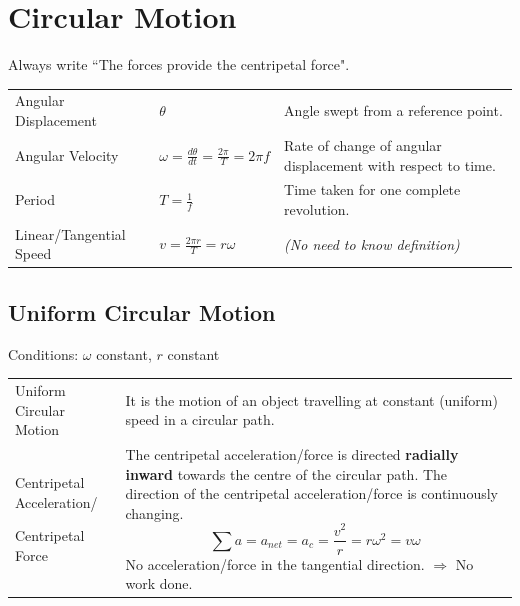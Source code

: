 \documentclass[a4paper,11pt]{article}
\begin{document}
	\section{Circular Motion}
		Always write ``The \underline{\hspace{1.5cm}} forces provide the centripetal force".
		\begin{center}
			\renewcommand{\arraystretch}{1.5}
			\begin{tabular}{@{} l l p{7cm} @{}}
				\toprule
				Angular Displacement & $\theta$ & Angle swept from a reference point. \\
				Angular Velocity & $\omega=\frac{d\theta}{dt}=\frac{2\pi}{T}=2\pi f$ & Rate of change of angular displacement with respect to time. \\
				Period & $T=\frac{1}{f}$ & Time taken for one complete revolution. \\
				Linear/Tangential Speed & $v=\frac{2\pi r}{T}=r\omega$ & \textit{(No need to know definition)}\\
				\bottomrule
			\end{tabular}
		\end{center}
		\subsection{Uniform Circular Motion}
			Conditions: $\omega$ constant, $r$ constant
			\begin{center}
				\renewcommand{\arraystretch}{1.2}
				\begin{tabular}{@{} p{4cm} p{10.6cm} @{}}
					\toprule
					Uniform Circular Motion & It is the motion of an object travelling at constant (uniform) speed in a circular path. \\
					Centripetal Acceleration/ \par Centripetal Force& The centripetal acceleration/force is directed \textbf{radially inward} towards the centre of the circular path. The direction of the centripetal acceleration/force is continuously changing. $$\sum a = a_{net} = a_c=\frac{v^2}{r}=r\omega^2=v\omega$$ No acceleration/force in the tangential direction. $\Rightarrow$ No work done. 
					\\
					\bottomrule
				\end{tabular}
			\end{center}
	\newpage
\end{document}
